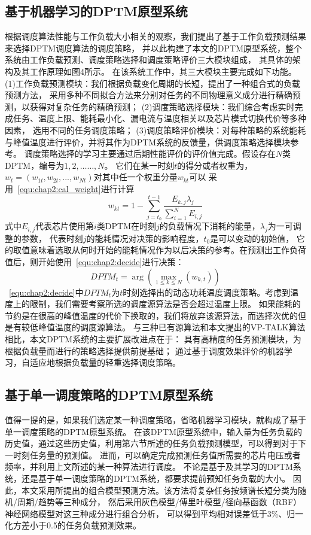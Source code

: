 \subsection{基于机器学习的DPTM原型系统}
根据调度算法性能与工作负载大小相关的观察，我们提出了基于工作负载预测结果来选择DPTM调度算法的调度策略， 并以此构建了本文的DPTM原型系统，整个系统由工作负载预测、调度策略选择和调度策略评价三大模块组成， 其具体的架构及其工作原理如图4所示。
在该系统工作中，其三大模块主要完成如下功能。 (1)工作负载预测模块：我们根据负载变化周期的长短，提出了一种组合式的负载预测方法， 采用多种不同拟合方法来分别对任务的不同物理意义成分进行精确预测，以获得对复杂任务的精确预测； (2)调度策略选择模块：我们综合考虑实时完成任务、温度上限、能耗最小化、漏电流与温度相关以及芯片模式切换代价等多种因素， 选用不同的任务调度策略； (3)调度策略评价模块：对每种策略的系统能耗与峰值温度进行评价，并将其作为DPTM系统的反馈量，供调度策略选择模块参考。
调度策略选择的学习主要通过后期性能评价的评价值完成。假设存在$N$类DPTM，编号为$1,2,……,N$。 它们在某一时刻$t$的得分或者权重为，$w_t=(w_{1t},w_{2t},...,w_{Nt})$对其中任一个权重分量$w_{kt}$可以 采用~\ref{equ:chap2:cal_weight}进行计算
\begin{equation}
\label{equ:chap2:cal_weight}
w_{kt} = 1- \sum\limits_{j=t_0}^{t-1} \frac{E_{k,j}\lambda_j}{\sum\limits_{i=1}^N E_{i,j}}
\end{equation}
式中$E_{i,j}$代表芯片使用第$i$类DPTM在时刻$j$的负载情况下消耗的能量，$\lambda_{j}$为一可调整的参数， 代表时刻$j$的能耗情况对决策的影响程度，$t_0$是可以变动的初始值， 它的取值意味着选取从何时开始的能耗情况作为以后决策的参考。在预测出工作负荷值后，则开始使用~\ref{equ:chap2:decide}进行决策：
\begin{equation}
\label{equ:chap2:decide}
DPTM_t = \arg(\max\limits_{1\le k \le N}(w_{k,t}))
\end{equation}
~\ref{equ:chap2:decide}中$DPTM_t$为$t$时刻选择出的动态功耗温度调度策略。考虑到温度上的限制，我们需要考察所选的调度源算法是否会超过温度上限。 如果能耗的节约是在很高的峰值温度的代价下换取的，我们将放弃该源算法，而选择次优的但是有较低峰值温度的调度源算法。
与三种已有源算法和本文提出的VP-TALK算法相比，本文DPTM系统的主要扩展改进点在于： 具有高精度的任务预测模块，为根据负载量而进行的策略选择提供前提基础； 通过基于调度效果评价的机器学习，自适应地根据负载量的轻重选择调度策略。

\subsection{基于单一调度策略的DPTM原型系统}
值得一提的是，如果我们选定某一种调度策略，省略机器学习模块，就构成了基于单一调度策略的DPTM原型系统。 在该DPTM原型系统中，输入量为任务负载的历史值，通过这些历史值，利用第六节所述的任务负载预测模型，可以得到对于下一时刻任务量的预测值。 进而，可以确定完成预测任务值所需要的芯片电压或者频率，并利用上文所述的某一种算法进行调度。
不论是基于及其学习的DPTM系统，还是基于单一调度策略的DPTM系统，都要求提前预知任务负载的大小。 因此，本文采用所提出的组合模型预测方法。该方法将复杂任务按频谱长短分类为随机/周期/趋势等三种成分， 然后采用灰色模型/傅里叶模型/径向基函数（RBF）神经网络模型对这三种成分进行组合分析， 可以得到平均相对误差低于3\%、归一化方差小于0.5的任务负载预测效果。 